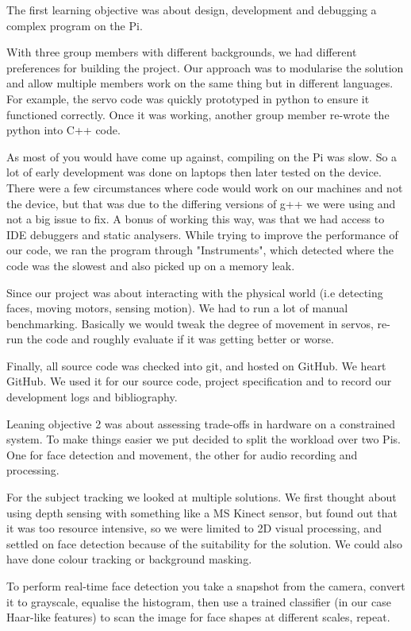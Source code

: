 \documentclass[11pt,a4paper,titlepage]{report}
\begin{document}
\begin{appendices}
The first learning objective was about design, development and debugging a complex program on the Pi. 

With three group members with different backgrounds, we had different preferences for building the project. Our approach was to modularise the solution and allow multiple members work on the same thing but in different languages. For example, the servo code was quickly prototyped in python to ensure it functioned correctly. Once it was working, another group member re-wrote the python into C++ code. 

As most of you would have come up against, compiling on the Pi was slow. So a lot of early development was done on laptops then later tested on the device. There were a few circumstances where code would work on our machines and not the device, but that was due to the differing versions of g++ we were using and not a big issue to fix. A bonus of working this way, was that we had access to IDE debuggers and static analysers. While trying to improve the performance of our code, we ran the program through "Instruments", which detected where the code was the slowest and also picked up on a memory leak. 

Since our project was about interacting with the physical world (i.e detecting faces, moving motors, sensing motion). We had to run a lot of manual benchmarking. Basically we would tweak the degree of movement in servos, re-run the code and roughly evaluate if it was getting better or worse.

Finally, all source code was checked into git, and hosted on GitHub. We heart GitHub. We used it for our source code, project specification and to record our development logs and bibliography.

Leaning objective 2 was about assessing trade-offs in hardware on a constrained system. To make things easier we put decided to split the workload over two Pis. One for face detection and movement, the other for audio recording and processing. 

For the subject tracking we looked at multiple solutions. We first thought about using depth sensing with something like a MS Kinect sensor, but found out that it was too resource intensive, so we were limited to 2D visual processing, and settled on face detection because of the suitability for the solution. We could also have done colour tracking or background masking.

To perform real-time face detection you take a snapshot from the camera, convert it to grayscale, equalise the histogram, then use a trained classifier (in our case Haar-like features) to scan the image for face shapes at different scales, repeat.


\end{appendices}
\end{document}
